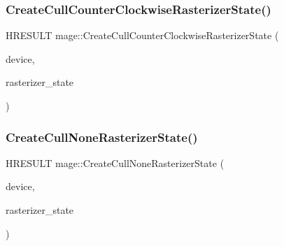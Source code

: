 \hypertarget{namespacemage_a9d5863bf2519cdac7a59c39dec10b938}{}\label{namespacemage_a9d5863bf2519cdac7a59c39dec10b938} 
\subsubsection{\texorpdfstring{Create\+Cull\+Counter\+Clockwise\+Rasterizer\+State()}{CreateCullCounterClockwiseRasterizerState()}}
{\footnotesize\ttfamily H\+R\+E\+S\+U\+LT mage\+::\+Create\+Cull\+Counter\+Clockwise\+Rasterizer\+State (\begin{DoxyParamCaption}\item[{I\+D3\+D11\+Device2 $\ast$}]{device,  }\item[{I\+D3\+D11\+Rasterizer\+State $\ast$$\ast$}]{rasterizer\+\_\+state }\end{DoxyParamCaption})}

\hypertarget{namespacemage_a7583853c115c9c5cecb583fa61157c25}{}\label{namespacemage_a7583853c115c9c5cecb583fa61157c25} 
\subsubsection{\texorpdfstring{Create\+Cull\+None\+Rasterizer\+State()}{CreateCullNoneRasterizerState()}}
{\footnotesize\ttfamily H\+R\+E\+S\+U\+LT mage\+::\+Create\+Cull\+None\+Rasterizer\+State (\begin{DoxyParamCaption}\item[{I\+D3\+D11\+Device2 $\ast$}]{device,  }\item[{I\+D3\+D11\+Rasterizer\+State $\ast$$\ast$}]{rasterizer\+\_\+state }\end{DoxyParamCaption})}

\hypertarget{namespacemage_a45746b9c8018b682c999fe1c5d4158db}{}\label{namespacemage_a45746b9c8018b682c999fe1c5d4158db} 
